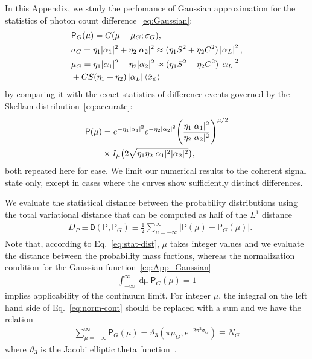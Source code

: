 \documentclass[%
reprint,
superscriptaddress,
 amsmath,amssymb,amsfonts,
 aps,
 pra,
 longbibliography
]{revtex4-2}
\newcommand{\avr}[1]{\ensuremath{\langle{#1}\rangle}}
\newcommand{\prob}{\mathsf{P}}
\newcommand{\dd}{\mathrm{d}}
\begin{document}
In this Appendix, we study the perfomance of Gaussian approximation for the statistics of photon count difference~\eqref{eq:Gaussian}:
\begin{align}
  &
  \label{eq:App_Gaussian}
    \prob_G(\mu)=G(\mu-\mu_G;\sigma_G),
    \\
  &
    \label{eq:App_sigma_G}
    \sigma_G=\eta_1|\alpha_1|^2+\eta_2|\alpha_2|^2
    \approx
    (\eta_1S^2+\eta_2C^2) \left|\alpha_L\right|^2,
  \\
  &
    \label{eq:App_mu_G}
    \mu_G=\eta_1|\alpha_1|^2-\eta_2|\alpha_2|^2
    \approx
    (\eta_1S^2-\eta_2C^2) \left|\alpha_L\right|^2
    \notag
  \\
  &
    +CS (\eta_1+\eta_2) \left|\alpha_L\right| \avr{\hat{x}_\phi}
\end{align}
by comparing it with the exact statistics of difference events
governed by the Skellam distribution~\eqref{eq:accurate}:
\begin{align}
  \label{eq:App_accurate}
  \prob(\mu)&=e^{-\eta_1|\alpha_1|^2}e^{-\eta_2|\alpha_2|^2}
    \Biggl(\frac{\eta_1|\alpha_1|^2}{\eta_2|\alpha_2|^2}\Biggr)^{\mu/2}
    \notag
  \\
  &
    \times
I_{\mu}\bigl(2\sqrt{\eta_1\eta_2|\alpha_1|^2|\alpha_2|^2}\bigr),
\end{align}
both repeated here for ease. We limit our numerical results to the coherent signal state only, except in cases where the curves show sufficiently distinct differences.

We evaluate the statistical distance between the probability distributions using the total variational distance
that can be computed as half of the $L^1$ distance
\begin{align}
  &
    \label{eq:stat-dist}
    D_P\equiv\mathtt{D}\left(\prob,\prob_{G}\right)\equiv
    \frac{1}{2}
    \sum_{\mu=-\infty}^{\infty}
    \left\lvert\prob(\mu) -\prob_G(\mu)\right\rvert.
  \end{align}
  Note that, according to Eq.~\eqref{eq:stat-dist},
  $\mu$ takes integer values and
  we evaluate the distance between the probability mass fuctions,
  whereas the normalization condition for
the Gaussian function~\eqref{eq:App_Gaussian}
\begin{align}
    \label{eq:norm-cont}
  \int_{-\infty}^{\infty}\mathop{\dd\mu}
    \prob_G(\mu)
    =1
\end{align}
implies applicability of the continuum limit.
For integer $\mu$,
the integral
on the left hand side of Eq.~\eqref{eq:norm-cont}
should be replaced with a sum
and we have the relation
\begin{align}
  \label{eq:discr-norm}
  \sum_{\mu=-\infty}^{\infty} \prob_G(\mu)=\vartheta_3(\pi\mu_G,e^{-2\pi^2\sigma_G})\equiv N_G
\end{align}
where $\vartheta_3$ is the Jacobi elliptic theta function~\cite{NIST:hndbk:2010}.
\end{document}

